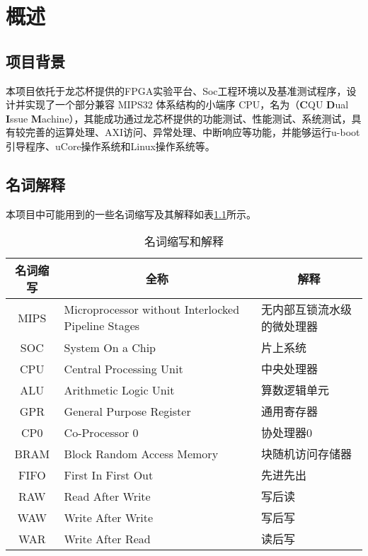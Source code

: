 \chapter{概述}

\section{项目背景}
本项目依托于龙芯杯提供的FPGA实验平台、Soc工程环境以及基准测试程序，设计并实现了一个部分兼容 MIPS32 体系结构的小端序 CPU，名为\cpuname（\textbf{C}QU \textbf{D}ual \textbf{I}ssue \textbf{M}achine），其能成功通过龙芯杯提供的功能测试、性能测试、系统测试，具有较完善的运算处理、AXI访问、异常处理、中断响应等功能，并能够运行u-boot引导程序、uCore操作系统和Linux操作系统等。

\section{名词解释}
本项目中可能用到的一些名词缩写及其解释如表\ref{table:abbreviation_definition}所示。

\begin{table}[!htbp]
    \centering
    \caption{名词缩写和解释}
    \label{table:abbreviation_definition}
    
    \begin{tabular}{cll}
    \toprule
    \multicolumn{1}{c}{\textbf{名词缩写}} & \multicolumn{1}{c}{\textbf{全称}}                   & \multicolumn{1}{c}{\textbf{解释}} \\ 
    \midrule
    MIPS                               & Microprocessor without Interlocked Pipeline Stages & 无内部互锁流水级的微处理器 \\
    SOC                                & System On a Chip                                   & 片上系统 \\
    CPU                                & Central Processing Unit                            & 中央处理器 \\
    ALU                                & Arithmetic Logic Unit                              & 算数逻辑单元 \\
    GPR                                & General Purpose Register                           & 通用寄存器 \\
    CP0                                & Co-Processor 0                                     & 协处理器0 \\
    BRAM                               & Block Random Access Memory                         & 块随机访问存储器 \\
    FIFO                               & First In First Out                                 & 先进先出 \\
    RAW                                & Read After Write                                   & 写后读 \\
    WAW                                & Write After Write                                  & 写后写 \\
    WAR                                & Write After Read                                   & 读后写 \\
    \bottomrule
    \end{tabular}
\end{table}

